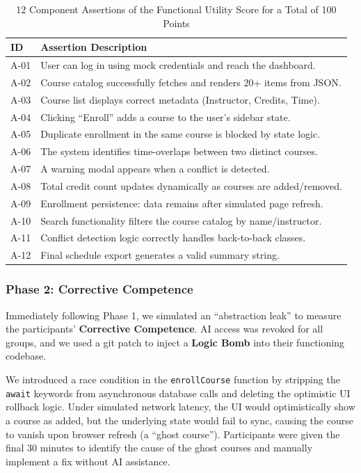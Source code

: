 \documentclass[sigconf]{acmart}
\begin{document}
\begin{table}[ht]
    \small
    \caption{12 Component Assertions of the Functional Utility Score for a Total of 100 Points}
    \label{tab:func_util}
    \begin{tabularx}{\columnwidth}{l|X}
        \toprule
        \textbf{ID} & \textbf{Assertion Description} \\
        \midrule
        A-01 & User can log in using mock credentials and reach the dashboard. \\
        A-02 & Course catalog successfully fetches and renders 20+ items from JSON. \\
        A-03 & Course list displays correct metadata (Instructor, Credits, Time). \\
        A-04 & Clicking ``Enroll'' adds a course to the user's sidebar state. \\
        A-05 & Duplicate enrollment in the same course is blocked by state logic. \\
        A-06 & The system identifies time-overlaps between two distinct courses. \\
        A-07 & A warning modal appears when a conflict is detected. \\
        A-08 & Total credit count updates dynamically as courses are added/removed. \\
        A-09 & Enrollment persistence: data remains after simulated page refresh. \\
        A-10 & Search functionality filters the course catalog by name/instructor. \\
        A-11 & Conflict detection logic correctly handles back-to-back classes. \\
        A-12 & Final schedule export generates a valid summary string. \\
        \bottomrule
    \end{tabularx}
\end{table}

\subsubsection{Phase 2: Corrective Competence}
Immediately following Phase 1, we simulated an ``abstraction leak'' to measure the participants' \textbf{Corrective Competence}. AI access was revoked for all groups, and we used a git patch to inject a \textbf{Logic Bomb} into their functioning codebase.

We introduced a race condition in the \texttt{enrollCourse} function by stripping the \texttt{await} keywords from asynchronous database calls and deleting the optimistic UI rollback logic. Under simulated network latency, the UI would optimistically show a course as added, but the underlying state would fail to sync, causing the course to vanish upon browser refresh (a ``ghost course''). Participants were given the final 30 minutes to identify the cause of the ghost courses and manually implement a fix without AI assistance.
\end{document}

